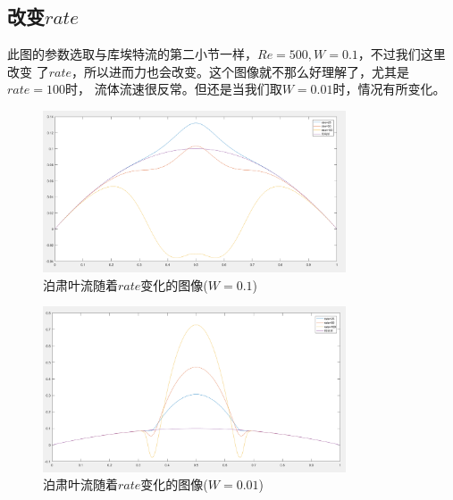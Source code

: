 \documentclass[11pt,UTF8]{ctexart}
\begin{document}
    \subsection{改变$rate$}
    \par{此图的参数选取与库埃特流的第二小节一样，$Re=500,W=0.1$，不过我们这里改变
    了$rate$，所以进而力也会改变。这个图像就不那么好理解了，尤其是$rate=100$时，
    流体流速很反常。但还是当我们取$W=0.01$时，情况有所变化。}
    \begin{figure}[h]
        \centerline{\includegraphics[width=0.8\textwidth]{Poiseuille_rate_W_0_1.png}}
        \caption{泊肃叶流随着$rate$变化的图像($W=0.1$)}
    \end{figure}
    \begin{figure}[h]
        \centerline{\includegraphics[width=0.8\textwidth]{Poiseuille_rate_W_0_01.png}}
        \caption{泊肃叶流随着$rate$变化的图像($W=0.01$)}
    \end{figure}
\end{document}
